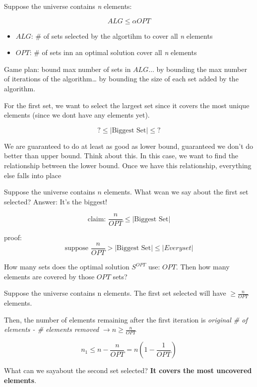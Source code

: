 \documentclass[11pt]{article}
\begin{document}
Suppose the universe contains \emph{n} elements:

\[ ALG \leq \alpha OPT\]

\begin{itemize}
\item \(ALG\): \# of sets selected by the algortihm to cover all \emph{n} elements
\item \(OPT\): \# of sets inn an optimal solution cover all \emph{n} elements
\end{itemize}

Game plan: bound max number of sets in \(ALG \ldots\) by bounding the max number of iterations of the algorithm\ldots{} by bounding the size of each set added by the algorithm.

For the first set, we want to select the largest set since it covers the most unique elements (since we dont have any elements yet).

\[ ? \leq  |\text{Biggest Set}| \leq ? \]

We are guaranteed to do at least as good as lower bound, guaranteed we don't do better than upper bound. Think about this. In this case, we want to find the relationship between the lower bound. Once we have this relationship, everything else falls into place

Suppose the universe contains \(n\) elements. What wcan we say about the first set selected? Answer: It's the biggest!

\[ \text{claim: } \frac{n}{OPT} \leq |\text{Biggest Set}| \]

proof: 
\[ \text{suppose } \frac{n}{OPT} > |\text{Biggest Set}| \leq |Every set| \]

How many sets does the optimal solution \(S^{OPT}\) use: \(OPT\).
Then how many elements are covered by those \(OPT\) sets?

Suppose the universe contains n elements. The first set selected will have \(\geq \frac{n}{OPT}\) elements.

Then, the number of elements remaining after the first iteration is \emph{original \# of elements - \# elements removed} \(\rightarrow n \geq \frac{n}{OPT}\)

\[ n_1 \leq n - \frac{n}{OPT} = n \left( 1- \frac{1}{OPT} \right) \]

What can we sayabout the second set selected? \textbf{\textbf{It covers the most uncovered elements}}.
\end{document}
